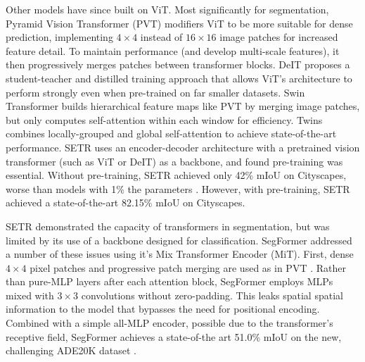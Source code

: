 \documentclass[a4paper,12pt]{report}
\begin{document}
Other models have since built on ViT. Most significantly for segmentation, Pyramid Vision Transformer (PVT) \cite{wang_pyramid_2021} modifiers ViT to be more suitable for dense prediction, implementing $4 \times 4$ instead of $16 \times 16$ image patches for increased feature detail. To maintain performance (and develop multi-scale features), it then progressively merges patches between transformer blocks. DeIT \cite{touvron_training_2021} proposes a student-teacher and distilled training approach that allows ViT’s architecture to perform strongly even when pre-trained on far smaller datasets. Swin Transformer \cite{liu_swin_2021} builds hierarchical feature maps like PVT by merging image patches, but only computes self-attention within each window for efficiency. Twins \cite{chu_twins_2021} combines locally-grouped and global self-attention to achieve state-of-the-art performance. SETR \cite{zheng_rethinking_2021} uses an encoder-decoder architecture with a pretrained vision transformer (such as ViT or DeIT) as a backbone, and found pre-training was essential. Without pre-training, SETR achieved only 42\% mIoU on Cityscapes, worse than models with 1\% the parameters \cite{paszke_enet_2016}. However, with pre-training, SETR achieved a state-of-the-art 82.15\% mIoU on Cityscapes.


SETR demonstrated the capacity of transformers in segmentation, but was limited by its use of a backbone designed for classification. SegFormer \cite{xie_segformer_2021} addressed a number of these issues using it’s Mix Transformer Encoder (MiT). First, dense $4 \times 4$ pixel patches and progressive patch merging are used as in PVT \cite{wang_pyramid_2021}. Rather than pure-MLP layers after each attention block, SegFormer employs MLPs mixed with $3 \times 3$ convolutions without zero-padding. This leaks spatial spatial information to the model that bypasses the need for positional encoding. Combined with a simple all-MLP encoder, possible due to the transformer’s receptive field, SegFormer achieves a state-of-the art 51.0\% mIoU on the new, challenging ADE20K dataset \cite{zhou_semantic_2018}.

\end{document}
